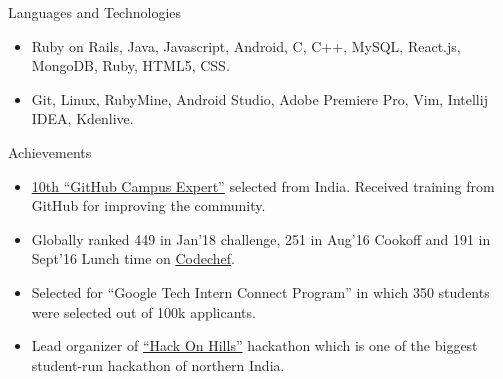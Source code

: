 \documentclass[]{mcdowellcv}
\begin{document}
	\begin{cvsection}{Languages and Technologies}
		\begin{cvsubsection}{}{}{}	
			\begin{itemize}
				\item Ruby on Rails, Java, Javascript, Android, C, C++, MySQL, React.js, MongoDB, Ruby, HTML5, CSS.
				\item Git, Linux, RubyMine, Android Studio, Adobe Premiere Pro, Vim, Intellij IDEA, Kdenlive.
			\end{itemize}
		\end{cvsubsection}
	\end{cvsection}
	
	\begin{cvsection}{Achievements}
		\begin{cvsubsection}{}{}{}	
			\begin{itemize}
				\item {\href {https://githubcampus.expert/sukhbir-singh/}{10th ``GitHub Campus Expert''}} selected from India. Received training from GitHub for improving the community.
				\item Globally ranked 449 in Jan'18 challenge, 251 in Aug'16 Cookoff and 191 in Sept'16 Lunch time on \href {https://www.codechef.com/}{Codechef}.
				\item Selected for ``Google Tech Intern Connect Program'' in which 350 students were selected out of 100k applicants.
				\item Lead organizer of {\href {http://hackonhills.com/}{``Hack On Hills''}} hackathon which is one of the biggest student-run hackathon of northern India.
			\end{itemize}
		\end{cvsubsection}
	\end{cvsection}
	
\end{document}
